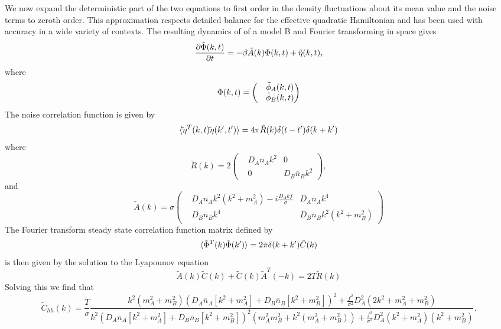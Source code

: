 We now expand the deterministic part of the two equations to first order in the density fluctuations about its mean value and the noise terms to zeroth order. This approximation respects detailed balance for the effective quadratic Hamiltonian and has been used with accuracy in a wide variety of contexts. The resulting dynamics of of a model B and Fourier transforming in space gives
\begin{equation}
\frac{\partial \tilde{\boldmath \Phi}(k,t)}{\partial t}= -\beta \tilde A(k){\boldmath \Phi}(k,t) + {\boldmath \tilde\eta}(k,t),
\end{equation}
where
\begin{equation}
{\boldmath \Phi}(k,t) =\begin{pmatrix} &\tilde \phi_A(k,t) \\ &\tilde \phi_B(k,t)\end{pmatrix}
\end{equation}
The noise correlation function is given by
\begin{equation}
\langle {\tilde\boldmath\eta}^{T}(k,t) {\tilde\boldmath{\eta}}(k',t')\rangle = 4\pi\tilde R(k) \delta(t-t')\delta(k+k')
\end{equation}
where 
\begin{equation}\tilde R(k)= 2\begin{pmatrix} & D_A\overline n_A k^2 & 0\\
& 0 & D_B\overline n_B k^2\end{pmatrix},
\end{equation}
and 
\begin{equation}
\tilde A(k) =\sigma\begin{pmatrix}& D_A\overline n_A k^2(k^2 + m_A^2) -i\frac{D_A k f}{\sigma} & 
D_A\overline n_A k^4 \\ & D_B\overline n_B k^4 & D_B \overline n_B k^2(k^2 + m_B^2)\end{pmatrix}
\end{equation}
The Fourier transform steady state correlation function matrix defined by
\begin{equation}
\langle {\boldmath\tilde\Phi}^T(k){\boldmath\tilde\Phi}(k')\rangle =
2\pi \delta(k+k') \tilde C(k)
\end{equation}
is then given by the solution to the Lyapounov equation
\begin{equation}
\tilde A(k)\tilde C(k) + \tilde C(k)\tilde A^T(-k) = 2T \tilde R(k)
\end{equation}
Solving this we find that
\begin{equation}
\tilde C_{hh}(k)= \frac{T}{\sigma}\frac{k^2(m_A^2+m_B^2)(D_A\overline n_A[k^2+m_A^2] +D_B\overline n_B[k^2+m_B^2] )^2 +\frac{f^2 }{\sigma^2}D_A^2(2k^2+m_A^2 + m_B^2)}{k^2(D_A\overline n_A[k^2+m_A^2] +D_B\overline n_B[k^2+m_B^2] )^2(m_A^2 m_B^2 + k^2(m_A^2 +m_B^2))
+\frac{f^2 }{\sigma^2}D_A^2(k^2+m_A^2)(k^2+m_B^2)}.
\end{equation}

